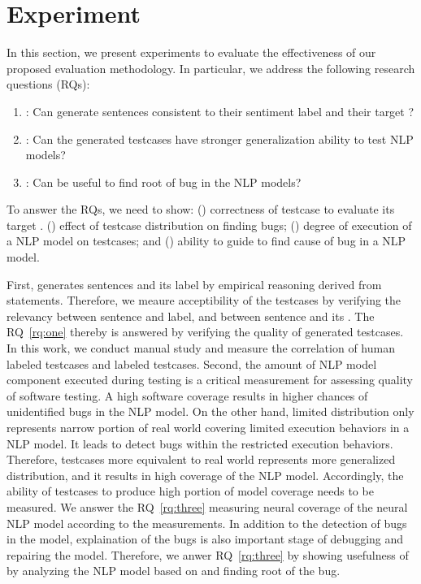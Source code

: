 \section{Experiment}
\label{sec:experiment}
%


In this section, we present experiments to evaluate the effectiveness
of our proposed evaluation methodology. In particular, we address the
following research questions (RQs):

\begin{enumerate}[label=\textbf{RQ\arabic*}]
\item \label{rq:one}: Can \tool generate sentences consistent to their
  sentiment label and their target \lc?
\item \label{rq:two}: Can the \tool generated testcases have stronger
  generalization ability to test NLP models?
\item \label{rq:three}: Can \tool be useful to find root of bug in the
  NLP models?
\end{enumerate}

To answer the RQs, we need to show: () correctness of testcase to
evaluate its target \lc.  () effect of testcase distribution on
finding bugs; () degree of execution of a NLP model on testcases;
and () ability to guide to find cause of bug in a NLP
model.

First, \tool generates sentences and its label by empirical reasoning
derived from \lc statements. Therefore, we meaure acceptibility of the
testcases by verifying the relevancy between sentence and label, and
between sentence and its \lc. The RQ~\ref{rq:one} thereby is answered
by verifying the quality of generated testcases. In this work, we
conduct manual study and measure the correlation of human labeled
testcases and \tool labeled testcases. Second, the amount of NLP model
component executed during testing is a critical measurement for
assessing quality of software testing. A high software coverage
results in higher chances of unidentified bugs in the NLP model. On
the other hand, limited distribution only represents narrow portion of
real world covering limited execution behaviors in a NLP model. It leads
to detect bugs within the restricted execution behaviors.  Therefore,
testcases more equivalent to real world represents more generalized
distribution, and it results in high coverage of the NLP model.
Accordingly, the ability of testcases to produce high portion of model
coverage needs to be measured. We answer the RQ~\ref{rq:three}
measuring neural coverage of the neural NLP model according to the
measurements. In addition to the detection of bugs in the model,
explaination of the bugs is also important stage of debugging and
repairing the model. Therefore, we anwer RQ~\ref{rq:three} by showing
usefulness of \tool by analyzing the NLP model based on \tool and
finding root of the bug.

